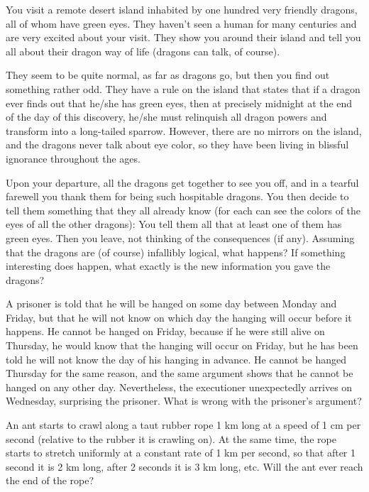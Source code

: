 \documentclass[12pt]{article}
\begin{document}
    \begin{exercise}
        You visit a remote desert island inhabited by one hundred very friendly dragons, all of whom have green eyes. They haven’t seen a human for many centuries and are very excited about your visit. They show you around their island and tell you all about their dragon way of life (dragons can talk, of course).
    
        They seem to be quite normal, as far as dragons go, but then you find out something rather odd. They have a rule on the island that states that if a dragon ever finds out that he/she has green eyes, then at precisely midnight at the end of the day of this discovery, he/she must relinquish all dragon powers and transform into a long-tailed sparrow. However, there are no mirrors on the island, and the dragons never talk about eye color, so they have been living in blissful ignorance throughout the ages.

        Upon your departure, all the dragons get together to see you off, and in a tearful farewell you thank them for being such hospitable dragons. You then decide to tell them something that they all already know (for each can see the colors of the eyes of all the other dragons): You tell them all that at least one of them has green eyes. Then you leave, not thinking of the consequences (if any). Assuming that the dragons are (of course) infallibly logical, what happens? If something interesting does happen, what exactly is the new information you gave the dragons?
    \end{exercise}
    
    \begin{exercise}
        A prisoner is told that he will be hanged on some day between Monday and Friday, but that he will not know on which day the hanging will occur before it happens. He cannot be hanged on Friday, because if he were still alive on Thursday, he would know that the hanging will occur on Friday, but he has been told he will not know the day of his hanging in advance. He cannot be hanged Thursday for the same reason, and the same argument shows that he cannot be hanged on any other day. Nevertheless, the executioner unexpectedly arrives on Wednesday, surprising the prisoner. What is wrong with the prisoner's argument?
    \end{exercise}

    \begin{exercise}
        An ant starts to crawl along a taut rubber rope 1 km long at a speed of 1 cm per second (relative to the rubber it is crawling on). At the same time, the rope starts to stretch uniformly at a constant rate of 1 km per second, so that after 1 second it is 2 km long, after 2 seconds it is 3 km long, etc. Will the ant ever reach the end of the rope?
    \end{exercise}
\end{document}
